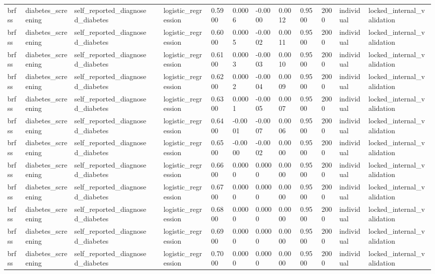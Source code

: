 \begin{tabular}{lllllllllllll}
brfss & diabetes\_screening & self\_reported\_diagnosed\_diabetes &  & logistic\_regression & 0.5900 & 0.0006 & -0.0000 & 0.0012 & 0.9500 & 2000 & individual & locked\_internal\_validation \\
brfss & diabetes\_screening & self\_reported\_diagnosed\_diabetes &  & logistic\_regression & 0.6000 & 0.0005 & -0.0002 & 0.0011 & 0.9500 & 2000 & individual & locked\_internal\_validation \\
brfss & diabetes\_screening & self\_reported\_diagnosed\_diabetes &  & logistic\_regression & 0.6100 & 0.0003 & -0.0003 & 0.0010 & 0.9500 & 2000 & individual & locked\_internal\_validation \\
brfss & diabetes\_screening & self\_reported\_diagnosed\_diabetes &  & logistic\_regression & 0.6200 & 0.0002 & -0.0004 & 0.0009 & 0.9500 & 2000 & individual & locked\_internal\_validation \\
brfss & diabetes\_screening & self\_reported\_diagnosed\_diabetes &  & logistic\_regression & 0.6300 & 0.0001 & -0.0005 & 0.0007 & 0.9500 & 2000 & individual & locked\_internal\_validation \\
brfss & diabetes\_screening & self\_reported\_diagnosed\_diabetes &  & logistic\_regression & 0.6400 & -0.0001 & -0.0007 & 0.0006 & 0.9500 & 2000 & individual & locked\_internal\_validation \\
brfss & diabetes\_screening & self\_reported\_diagnosed\_diabetes &  & logistic\_regression & 0.6500 & -0.0000 & -0.0002 & 0.0000 & 0.9500 & 2000 & individual & locked\_internal\_validation \\
brfss & diabetes\_screening & self\_reported\_diagnosed\_diabetes &  & logistic\_regression & 0.6600 & 0.0000 & 0.0000 & 0.0000 & 0.9500 & 2000 & individual & locked\_internal\_validation \\
brfss & diabetes\_screening & self\_reported\_diagnosed\_diabetes &  & logistic\_regression & 0.6700 & 0.0000 & 0.0000 & 0.0000 & 0.9500 & 2000 & individual & locked\_internal\_validation \\
brfss & diabetes\_screening & self\_reported\_diagnosed\_diabetes &  & logistic\_regression & 0.6800 & 0.0000 & 0.0000 & 0.0000 & 0.9500 & 2000 & individual & locked\_internal\_validation \\
brfss & diabetes\_screening & self\_reported\_diagnosed\_diabetes &  & logistic\_regression & 0.6900 & 0.0000 & 0.0000 & 0.0000 & 0.9500 & 2000 & individual & locked\_internal\_validation \\
brfss & diabetes\_screening & self\_reported\_diagnosed\_diabetes &  & logistic\_regression & 0.7000 & 0.0000 & 0.0000 & 0.0000 & 0.9500 & 2000 & individual & locked\_internal\_validation \\

\end{tabular}
